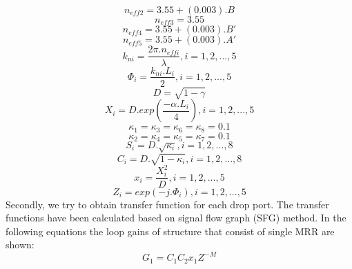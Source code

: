 \documentclass{osa-article}
\begin{document}
 \begin{equation}
n_{eff2}=3.55+(0.003).B
\label{eqa7}
\end{equation}
 \begin{equation}
n_{eff3}=3.55
\label{eqa8}
\end{equation}
 \begin{equation}
n_{eff4}=3.55+(0.003). B'
\label{eqa9}
\end{equation}
 \begin{equation}
n_{eff5}=3.55+(0.003). A'
\label{eqa10}
\end{equation}
 \begin{equation}
k_{ni}=\frac{2{\pi}.n_{effi}}{\lambda}, i=1, 2, ..., 5
\label{eqa11}
\end{equation}
 \begin{equation}
\Phi_{i}=\frac{k_{ni}.L_{i}}{2}, i=1, 2, ..., 5
\label{eqa12}
\end{equation}
 \begin{equation}
D=\sqrt{1-\gamma}
\label{eqa13}
\end{equation}
 \begin{equation}
X_{i}=D.exp(\frac{-\alpha.L_{i}}{4}), i=1, 2, ...,5
\label{eqa14}
\end{equation}
 \begin{equation}
\kappa_1=\kappa_3=\kappa_6=\kappa_8=0.1
\label{eqa15}
\end{equation}
 \begin{equation}
\kappa_2=\kappa_4=\kappa_5=\kappa_7=0.1
\label{eqa16}
\end{equation}
 \begin{equation}
S_i=D.\sqrt{\kappa_i}, i=1, 2, ..., 8
\label{eqa17}
\end{equation}
 \begin{equation}
C_i=D.\sqrt{1-\kappa_i}, i=1, 2, ..., 8
\label{eqa18}
\end{equation}
 \begin{equation}
x_i=\frac{X^2_i}{D}, i=1, 2, ..., 5
\label{eqa19}
\end{equation}
 \begin{equation}
Z_i=exp(-j.\Phi_i), i=1, 2, ..., 5
\label{eqa20}
\end{equation}
Secondly, we try to obtain transfer function for each drop port. The transfer functions have been calculated based on signal flow graph (SFG) method. In the following equations the loop gains of structure that consist of single MRR are shown:
 \begin{equation}
G_1=C_1C_2x_1Z^{-M}
\label{eqa21}
\end{equation}
\end{document}
